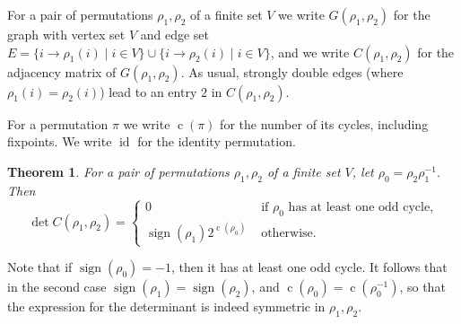 \documentclass[10pt]{article}
\newtheorem{theorem}{Theorem}
\theoremstyle{definition}
\DeclareMathOperator{\sign}{sign}
\DeclareMathOperator{\cl}{c}
\DeclareMathOperator{\id}{id}
\begin{document}
For a pair of permutations $ \rho_1, \rho_2 $ of a finite set $ V $ we write $ G(\rho_1,\rho_2) $ for the
graph with vertex set $ V $ and edge set
$ E = \{ i \to \rho_1(i) \mid i \in V \} \cup \{ i \to \rho_2(i) \mid i \in V \} $, and we write
$ C(\rho_1,\rho_2) $ for the adjacency matrix of $ G(\rho_1,\rho_2) $. As usual, strongly double edges
(where $ \rho_1(i) = \rho_2(i) $) lead to an entry $ 2 $ in $ C(\rho_1,\rho_2) $.

For a permutation $ \pi $ we write $ \cl(\pi) $ for the number of its cycles, including fixpoints.
We write $ \id $ for the identity permutation.

\begin{theorem} \label{thm:permutations}
    For a pair of permutations $ \rho_1, \rho_2 $ of a finite set $ V $, let
    $ \rho_0 = \rho_2 \rho_1^{-1} $. Then
    \[ \det C(\rho_1,\rho_2) =
    \begin{cases} 0 & \text{ if } \rho_0 \text{ has at least one odd cycle,} \\
        \sign(\rho_1) 2^{\cl(\rho_0)} & \text{ otherwise.} \end{cases} \]
\end{theorem}

Note that if $ \sign(\rho_0) = -1 $, then it has at least one odd cycle. It follows that in the second
case $ \sign(\rho_1) = \sign(\rho_2) $, and $ \cl(\rho_0) = \cl(\rho_0^{-1}) $, so that the expression for
the determinant is indeed symmetric in $ \rho_1, \rho_2 $.
\end{document}

